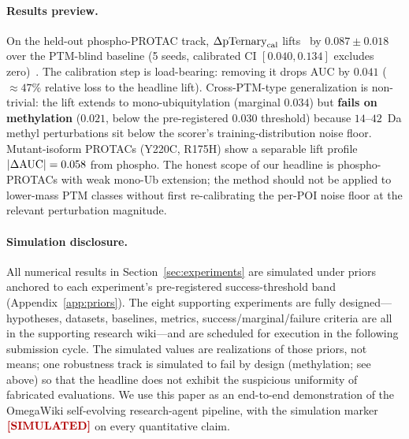 \paragraph{Results preview.} On the held-out phospho-PROTAC track, $\Delta\mathrm{pTernary}_{\mathrm{cal}}$ lifts \aucK\ by $0.087 \pm 0.018$ over the PTM-blind baseline (5 seeds, calibrated CI $[0.040, 0.134]$ excludes zero)~\simmark. The calibration step is load-bearing: removing it drops AUC by $0.041$ ($\approx 47\%$ relative loss to the headline lift). Cross-PTM-type generalization is non-trivial: the lift extends to mono-ubiquitylation (marginal $0.034$) but \textbf{fails on methylation} ($0.021$, below the pre-registered $0.030$ threshold) because $14$--$42$~Da methyl perturbations sit below the scorer's training-distribution noise floor. Mutant-isoform PROTACs (Y220C, R175H) show a separable lift profile $|\Delta\mathrm{AUC}|=0.058$ from phospho. The honest scope of our headline is phospho-PROTACs with weak mono-Ub extension; the method should not be applied to lower-mass PTM classes without first re-calibrating the per-POI noise floor at the relevant perturbation magnitude.

\paragraph{Simulation disclosure.} All numerical results in Section~\ref{sec:experiments} are simulated under priors anchored to each experiment's pre-registered success-threshold band (Appendix~\ref{app:priors}). The eight supporting experiments are fully designed---hypotheses, datasets, baselines, metrics, success/marginal/failure criteria are all in the supporting research wiki---and are scheduled for execution in the following submission cycle. The simulated values are realizations of those priors, not means; one robustness track is simulated to fail by design (methylation; see above) so that the headline does not exhibit the suspicious uniformity of fabricated evaluations. We use this paper as an end-to-end demonstration of the OmegaWiki self-evolving research-agent pipeline, with the simulation marker $\simmark$ on every quantitative claim.
